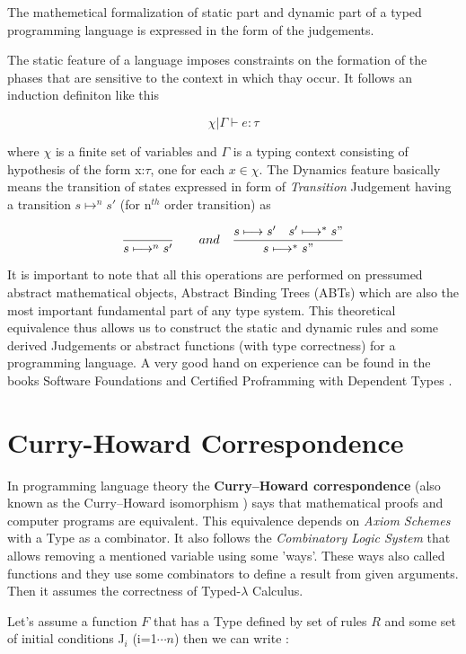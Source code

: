 The mathemetical formalization of static part and dynamic part of a typed programming language is expressed in the form of the judgements.

The static feature of a language imposes constraints on the formation of the phases that are sensitive to the context in which thay occur. It follows an induction definiton like this

\[\chi | \Gamma\vdash e:\tau\]

where $\chi$ is a finite set of variables and $\Gamma$ is a typing context consisting of hypothesis of the form x:$\tau$, one for each $x\in\chi$. The Dynamics feature basically means the transition of states expressed in form of \textit{Transition} Judgement having a transition $s\longmapsto^n s'$ (for n$^{th}$ order transition) as

\[\dfrac{}{s\longmapsto^n s'} \quad \quad and \quad \dfrac{{s\longmapsto s'} \quad {s'\longmapsto^{*} s"}}{s\longmapsto^{*} s"}  \]

It is important to note that all this operations are performed on pressumed abstract mathematical objects, Abstract Binding Trees (ABTs) which are also the most important fundamental part of any type system. This theoretical equivalence thus allows us to construct the static and dynamic rules and some derived Judgements or abstract functions (with type correctness) for a programming language. A very good hand on experience can be found in the books Software Foundations \cite{Softwarefoundations} and Certified Proframming with Dependent Types \cite{cpdt}.

\section{Curry-Howard Correspondence }
In programming language theory the \textbf{Curry–Howard correspondence}\cite{curry_howard} (also known as the Curry–Howard isomorphism ) says that mathematical proofs and computer programs are equivalent. This equivalence depends on \textit{Axiom Schemes} with a Type as a combinator. It also follows the \textit{Combinatory Logic System} that allows removing a mentioned variable using some 'ways'. These ways also called functions and they use some combinators to define a result from given arguments. Then it assumes the correctness of Typed-$\lambda$ Calculus. 

Let's assume a function $F$ that has a Type defined by set of rules $R$ and some set of initial conditions J$_i$ (i=1$\cdots n$) then we can write :

